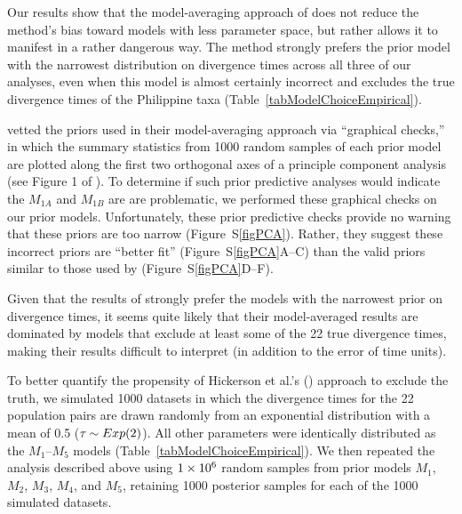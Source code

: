 \documentclass[letterpaper,12pt]{article}
\begin{document}
\begin{linenumbers}
Our results show that the model-averaging approach of \citet{Hickerson2013}
does not reduce the method's bias toward models with less parameter space,
but rather allows it to manifest in a rather dangerous way.
The method strongly prefers the prior model with the narrowest distribution on
divergence times across all three of our analyses, even when this model is
almost certainly incorrect and excludes the true divergence times of the
Philippine taxa (Table~\ref{tabModelChoiceEmpirical}).

\citet{Hickerson2013} vetted the priors used in their model-averaging approach
via ``graphical checks,'' in which the summary statistics from 1000 random
samples of each prior model are plotted along the first two orthogonal axes of
a principle component analysis (see Figure 1 of \citet{Hickerson2013}).
To determine if such prior predictive analyses would indicate the $M_{1A}$ and
$M_{1B}$ are are problematic, we performed these graphical checks on our prior
models.
Unfortunately, these prior predictive checks provide no warning that these
priors are too narrow (Figure~S\ref{figPCA}).
Rather, they suggest these incorrect priors are ``better fit''
(Figure~S\ref{figPCA}A--C) than the valid priors similar to those used by
\citet{Oaks2012} (Figure~S\ref{figPCA}D--F).

Given that the results of \citet{Hickerson2013} strongly prefer the models with
the narrowest prior on divergence times, it seems quite likely that their
model-averaged results are dominated by models that exclude at least some of
the 22 true divergence times, making their results difficult to interpret
(in addition to the error of time units).


To better quantify the propensity of Hickerson et al.'s
(\citeyear{Hickerson2013}) approach to exclude the truth, we simulated 1000
datasets in which the divergence times for the 22 population pairs are drawn
randomly from an exponential distribution with a mean of 0.5 ($\tau_{} \sim
Exp(2)$).
All other parameters were identically distributed as the $M_1$--$M_5$ models
(Table~\ref{tabModelChoiceEmpirical}).
We then repeated the analysis described above using $1\times 10^{6}$ random samples from
prior models $M_1$, $M_2$, $M_3$, $M_4$, and $M_5$, retaining 1000 posterior
samples for each of the 1000 simulated datasets.


\end{linenumbers}
\end{document}
